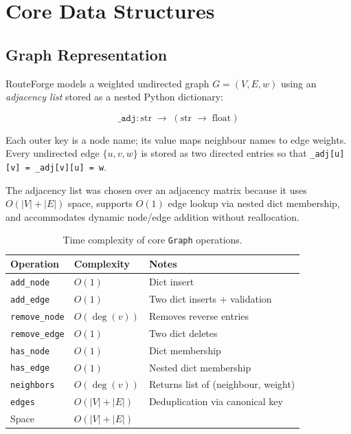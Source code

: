 \documentclass[12pt, a4paper]{article}
\begin{document}
\section{Core Data Structures}
\label{sec:ds}

\subsection{Graph Representation}

RouteForge models a weighted undirected graph $G = (V, E, w)$ using an
\emph{adjacency list} stored as a nested Python dictionary:

\[
    \texttt{\_adj} : \text{str} \;\to\; (\text{str} \;\to\; \text{float})
\]

Each outer key is a node name; its value maps neighbour names to edge
weights. Every undirected edge $\{u,v,w\}$ is stored as two directed
entries so that \texttt{\_adj[u][v] = \_adj[v][u] = w}.

The adjacency list was chosen over an adjacency matrix because it uses
$O(|V|+|E|)$ space, supports $O(1)$ edge lookup via nested dict membership,
and accommodates dynamic node/edge addition without reallocation.

\begin{table}[H]
\centering
\caption{Time complexity of core \texttt{Graph} operations.}
\begin{tabular}{@{}lll@{}}
\toprule
\textbf{Operation} & \textbf{Complexity} & \textbf{Notes} \\
\midrule
\texttt{add\_node}    & $O(1)$          & Dict insert \\
\texttt{add\_edge}    & $O(1)$          & Two dict inserts + validation \\
\texttt{remove\_node} & $O(\deg(v))$   & Removes reverse entries \\
\texttt{remove\_edge} & $O(1)$          & Two dict deletes \\
\texttt{has\_node}    & $O(1)$          & Dict membership \\
\texttt{has\_edge}    & $O(1)$          & Nested dict membership \\
\texttt{neighbors}    & $O(\deg(v))$   & Returns list of (neighbour, weight) \\
\texttt{edges}        & $O(|V|+|E|)$   & Deduplication via canonical key \\
Space                 & $O(|V|+|E|)$   & \\
\bottomrule
\end{tabular}
\end{table}
\end{document}
